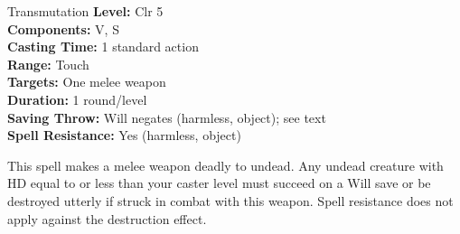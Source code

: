{Transmutation}
{
	\textbf{Level:}
	Clr 5\\
	\textbf{Components:}
	V, S\\
	\textbf{Casting Time:}
	1 standard action\\
	\textbf{Range:}
	Touch\\
	\textbf{Targets:}
	One melee weapon\\
	\textbf{Duration:}
	1 round/level\\
	\textbf{Saving Throw:}
	Will negates (harmless, object); see text\\
	\textbf{Spell Resistance:}
	Yes (harmless, object)\\
}
{
	This spell makes a melee weapon deadly to undead. Any undead creature with HD equal to or less than your caster level must succeed on a Will save or be destroyed utterly if struck in combat with this weapon. Spell resistance does not apply against the destruction effect.

}
